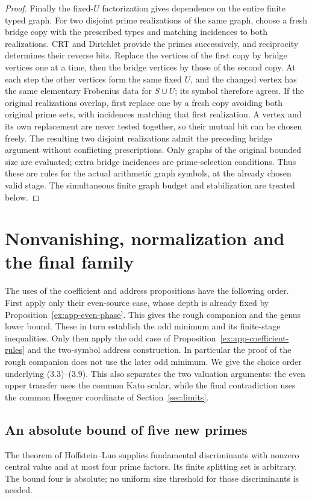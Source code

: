\begin{proof}
Finally the fixed-$U$ factorization gives dependence on the entire
finite typed graph. For two disjoint prime realizations of the same
graph, choose a fresh bridge copy with the prescribed types and
matching incidences to both realizations. CRT and Dirichlet provide
the primes successively, and reciprocity determines their reverse
bits. Replace the vertices of the first copy by bridge vertices one
at a time, then the bridge vertices by those of the second copy.
At each step the other vertices form the same fixed $U$, and the
changed vertex has the same elementary Frobenius data for $S\cup U$;
its symbol therefore agrees. If the original realizations overlap,
first replace one by a fresh copy avoiding both original prime sets,
with incidences matching that first realization. A vertex and its
own replacement are never tested together, so their mutual bit can
be chosen freely. The resulting two disjoint realizations admit the
preceding bridge argument without conflicting prescriptions.
Only graphs of the original bounded size are evaluated; extra bridge
incidences are prime-selection conditions. Thus these are rules for
the actual arithmetic graph symbols, at the already chosen valid
stage. The simultaneous finite graph budget and stabilization are
treated below.
\end{proof}



\section{Nonvanishing, normalization and the final family}\label{app:endpoints}
The uses of the coefficient and address propositions have the following
order. First apply only their even-source case, whose depth is already
fixed by Proposition~\ref{ex:app-even-phase}. This gives the rough
companion and the genus lower bound. These in turn establish the odd
minimum and its finite-stage inequalities. Only then apply the odd
case of Proposition~\ref{ex:app-coefficient-rules} and the two-symbol
address construction. In particular the proof of the rough companion
does not use the later odd minimum.
We give the choice order underlying (3.3)--(3.9). This also separates
the two valuation arguments: the even upper transfer uses the common
Kato scalar, while the final contradiction uses the common Heegner
coordinate of Section~\ref{sec:limits}.

\subsection{An absolute bound of five new primes}
The theorem of Hoffstein--Luo \cite[p.~436]{hl} supplies fundamental
discriminants with nonzero central value and at most four prime
factors. Its finite splitting set is arbitrary. The bound four is
absolute; no uniform size threshold for those discriminants is needed.

